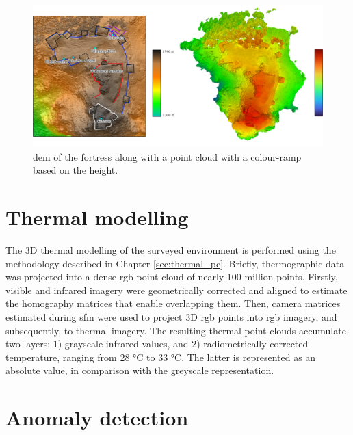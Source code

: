 \begin{figure}[htbp]
    \centering
    \includegraphics[width=\linewidth]{figs/castle_puerta_arenas/fortress_height.png}
    \caption{\acrshort{dem} of the fortress along with a point cloud with a colour-ramp based on the height. }
    \label{fig:thermal_castle_dem}
\end{figure}

\section{Thermal modelling}

The 3D thermal modelling of the surveyed environment is performed using the methodology described in Chapter \ref{sec:thermal_pc}. Briefly, thermographic data was projected into a dense \acrshort{rgb} point cloud of nearly 100 million points. Firstly, visible and infrared imagery were geometrically corrected and aligned to estimate the homography matrices that enable overlapping them. Then, camera matrices estimated during \acrshort{sfm} were used to project 3D \acrshort{rgb} points into \acrshort{rgb} imagery, and subsequently, to thermal imagery. The resulting thermal point clouds accumulate two layers: 1) grayscale infrared values, and 2) radiometrically corrected temperature, ranging from 28 \si{\celsius} to 33 \si{\celsius}. The latter is represented as an absolute value, in comparison with the greyscale representation.

\section{Anomaly detection}

